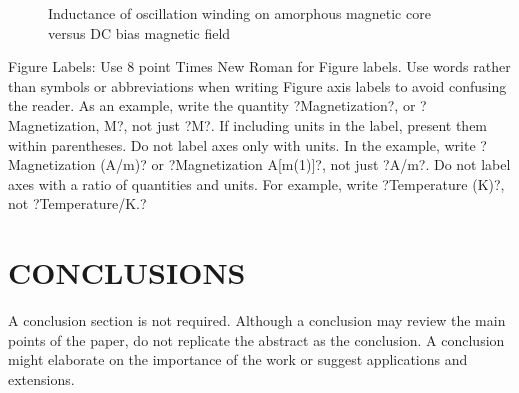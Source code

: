 \documentclass[letterpaper, 10 pt, conference]{ieeeconf}  %
\begin{document}
   \begin{figure}[thpb]
      \centering
      \caption{Inductance of oscillation winding on amorphous
       magnetic core versus DC bias magnetic field}
      \label{figurelabel}
   \end{figure}
   

Figure Labels: Use 8 point Times New Roman for Figure labels. Use words rather than symbols or abbreviations when writing Figure axis labels to avoid confusing the reader. As an example, write the quantity ?Magnetization?, or ?Magnetization, M?, not just ?M?. If including units in the label, present them within parentheses. Do not label axes only with units. In the example, write ?Magnetization (A/m)? or ?Magnetization {A[m(1)]}?, not just ?A/m?. Do not label axes with a ratio of quantities and units. For example, write ?Temperature (K)?, not ?Temperature/K.?

\section{CONCLUSIONS}

A conclusion section is not required. Although a conclusion may review the main points of the paper, do not replicate the abstract as the conclusion. A conclusion might elaborate on the importance of the work or suggest applications and extensions. 

\addtolength{\textheight}{-12cm}   %




\end{document}
